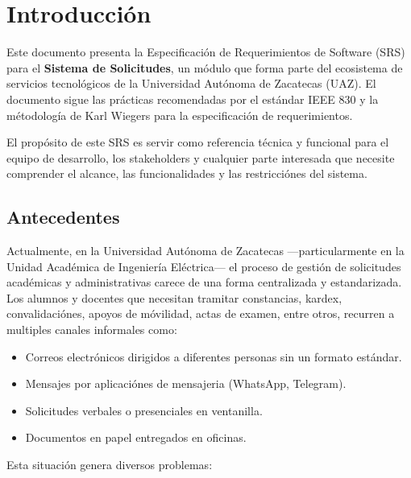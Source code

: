 \chapter{Introducción}

Este documento presenta la Especificación de Requerimientos de Software (SRS) para el \textbf{Sistema de Solicitudes}, un módulo que forma parte del ecosistema de servicios tecnológicos de la Universidad Autónoma de Zacatecas (UAZ). El documento sigue las prácticas recomendadas por el estándar IEEE 830 \cite{ieee830} y la métodología de Karl Wiegers \cite{wiegers} para la especificación de requerimientos.

El propósito de este SRS es servir como referencia técnica y funcional para el equipo de desarrollo, los stakeholders y cualquier parte interesada que necesite comprender el alcance, las funcionalidades y las restricciónes del sistema.

\section{Antecedentes}

Actualmente, en la Universidad Autónoma de Zacatecas ---particularmente en la Unidad Académica de Ingeniería Eléctrica--- el proceso de gestión de solicitudes académicas y administrativas carece de una forma centralizada y estandarizada. Los alumnos y docentes que necesitan tramitar constancias, kardex, convalidaciónes, apoyos de móvilidad, actas de examen, entre otros, recurren a multiples canales informales como:

\begin{itemize}
    \item Correos electrónicos dirigidos a diferentes personas sin un formato estándar.
    \item Mensajes por aplicaciónes de mensajeria (WhatsApp, Telegram).
    \item Solicitudes verbales o presenciales en ventanilla.
    \item Documentos en papel entregados en oficinas.
\end{itemize}

Esta situación genera diversos problemas:

